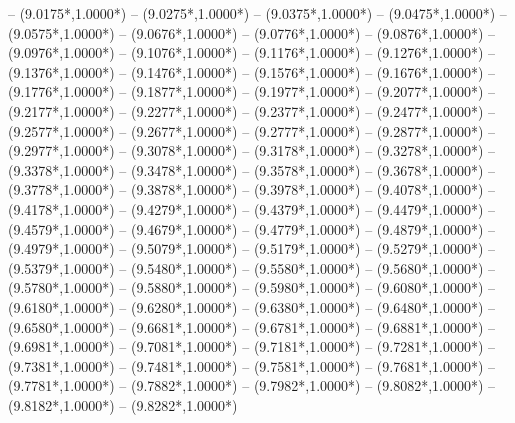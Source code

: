 {	-- ({9.0175*\dx},{1.0000*\dy})
	-- ({9.0275*\dx},{1.0000*\dy})
	-- ({9.0375*\dx},{1.0000*\dy})
	-- ({9.0475*\dx},{1.0000*\dy})
	-- ({9.0575*\dx},{1.0000*\dy})
	-- ({9.0676*\dx},{1.0000*\dy})
	-- ({9.0776*\dx},{1.0000*\dy})
	-- ({9.0876*\dx},{1.0000*\dy})
	-- ({9.0976*\dx},{1.0000*\dy})
	-- ({9.1076*\dx},{1.0000*\dy})
	-- ({9.1176*\dx},{1.0000*\dy})
	-- ({9.1276*\dx},{1.0000*\dy})
	-- ({9.1376*\dx},{1.0000*\dy})
	-- ({9.1476*\dx},{1.0000*\dy})
	-- ({9.1576*\dx},{1.0000*\dy})
	-- ({9.1676*\dx},{1.0000*\dy})
	-- ({9.1776*\dx},{1.0000*\dy})
	-- ({9.1877*\dx},{1.0000*\dy})
	-- ({9.1977*\dx},{1.0000*\dy})
	-- ({9.2077*\dx},{1.0000*\dy})
	-- ({9.2177*\dx},{1.0000*\dy})
	-- ({9.2277*\dx},{1.0000*\dy})
	-- ({9.2377*\dx},{1.0000*\dy})
	-- ({9.2477*\dx},{1.0000*\dy})
	-- ({9.2577*\dx},{1.0000*\dy})
	-- ({9.2677*\dx},{1.0000*\dy})
	-- ({9.2777*\dx},{1.0000*\dy})
	-- ({9.2877*\dx},{1.0000*\dy})
	-- ({9.2977*\dx},{1.0000*\dy})
	-- ({9.3078*\dx},{1.0000*\dy})
	-- ({9.3178*\dx},{1.0000*\dy})
	-- ({9.3278*\dx},{1.0000*\dy})
	-- ({9.3378*\dx},{1.0000*\dy})
	-- ({9.3478*\dx},{1.0000*\dy})
	-- ({9.3578*\dx},{1.0000*\dy})
	-- ({9.3678*\dx},{1.0000*\dy})
	-- ({9.3778*\dx},{1.0000*\dy})
	-- ({9.3878*\dx},{1.0000*\dy})
	-- ({9.3978*\dx},{1.0000*\dy})
	-- ({9.4078*\dx},{1.0000*\dy})
	-- ({9.4178*\dx},{1.0000*\dy})
	-- ({9.4279*\dx},{1.0000*\dy})
	-- ({9.4379*\dx},{1.0000*\dy})
	-- ({9.4479*\dx},{1.0000*\dy})
	-- ({9.4579*\dx},{1.0000*\dy})
	-- ({9.4679*\dx},{1.0000*\dy})
	-- ({9.4779*\dx},{1.0000*\dy})
	-- ({9.4879*\dx},{1.0000*\dy})
	-- ({9.4979*\dx},{1.0000*\dy})
	-- ({9.5079*\dx},{1.0000*\dy})
	-- ({9.5179*\dx},{1.0000*\dy})
	-- ({9.5279*\dx},{1.0000*\dy})
	-- ({9.5379*\dx},{1.0000*\dy})
	-- ({9.5480*\dx},{1.0000*\dy})
	-- ({9.5580*\dx},{1.0000*\dy})
	-- ({9.5680*\dx},{1.0000*\dy})
	-- ({9.5780*\dx},{1.0000*\dy})
	-- ({9.5880*\dx},{1.0000*\dy})
	-- ({9.5980*\dx},{1.0000*\dy})
	-- ({9.6080*\dx},{1.0000*\dy})
	-- ({9.6180*\dx},{1.0000*\dy})
	-- ({9.6280*\dx},{1.0000*\dy})
	-- ({9.6380*\dx},{1.0000*\dy})
	-- ({9.6480*\dx},{1.0000*\dy})
	-- ({9.6580*\dx},{1.0000*\dy})
	-- ({9.6681*\dx},{1.0000*\dy})
	-- ({9.6781*\dx},{1.0000*\dy})
	-- ({9.6881*\dx},{1.0000*\dy})
	-- ({9.6981*\dx},{1.0000*\dy})
	-- ({9.7081*\dx},{1.0000*\dy})
	-- ({9.7181*\dx},{1.0000*\dy})
	-- ({9.7281*\dx},{1.0000*\dy})
	-- ({9.7381*\dx},{1.0000*\dy})
	-- ({9.7481*\dx},{1.0000*\dy})
	-- ({9.7581*\dx},{1.0000*\dy})
	-- ({9.7681*\dx},{1.0000*\dy})
	-- ({9.7781*\dx},{1.0000*\dy})
	-- ({9.7882*\dx},{1.0000*\dy})
	-- ({9.7982*\dx},{1.0000*\dy})
	-- ({9.8082*\dx},{1.0000*\dy})
	-- ({9.8182*\dx},{1.0000*\dy})
	-- ({9.8282*\dx},{1.0000*\dy})
}
